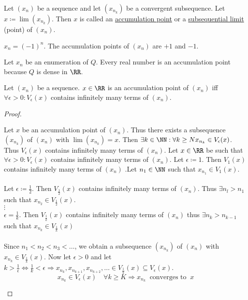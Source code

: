 \documentclass[class=scrartcl, crop=false]{standalone}
\begin{document}
\begin{definition}
  Let $(x_n)$ be a sequence and let $(x_{n_k})$ be a convergent subsequence. Let $x \coloneqq \lim(x_{n_k})$. Then $x$ is called an \ul{accumulation point} or a \ul{subsequential limit} (point) of $(x_n)$.
\end{definition}

\begin{example}
  $x_n = (-1)^n$. The accumulation points of $(x_n)$ are $+1$ and $-1$.
\end{example}
\begin{example}
  Let $x_n$ be an enumeration of $Q$. Every real number is an accumulation point because $Q$ is dense in $\RR$.
\end{example}

\begin{theorem}
  Let $(x_n)$ be a sequence. $x \in \RR$ is an accumulation point of $(x_n)$ iff $\forall \epsilon > 0: V_\epsilon(x)$ contains infinitely many terms of $(x_n)$.
  \begin{proof}
    \begin{itemize}
      \ii[]
      \ii[$(\Rightarrow)$ ]
      Let $x$ be an accumulation point of $(x_n)$. Thus there exists a subsequence $(x_{n_k})$ of $(x_n)$ with $\lim(x_{n_k}) = x$. Then $\exists k \in \NN: \forall k \geq N x_{n_k} \in V_\epsilon(x)$. Thus $V_\epsilon(x)$ contains infinitely many terms of $(x_n)$. 
      \ii[$(\Leftarrow)$ ]
      Let $x \in \RR$ be such that $\forall \epsilon > 0:V_\epsilon(x)$ contains infinitely many terms of $(x_n)$. Let $\epsilon \coloneqq 1$. Then $V_1(x)$ contains infinitely many terms of $(x_n)$ .Let $n_1 \in \NN$ such that $x_{n_1} \in V_1(x)$.
      \\\\
      Let $\epsilon \coloneqq \frac{1}{2}$. Then $V_{\frac{1}{2}}(x)$ contains infinitely many terms of $(x_n)$. Thus $\exists n_l > n_1$ such that $x_{n_2} \in V_{\frac{1}{2}}(x)$.
      \\
      $\vdots$
      \\
      $\epsilon = \frac{1}{k}$. Then $V_{\frac{1}{k}}(x)$ contains infinitely many terms of $(x_n)$ thus $\exists n_k > n_{k - 1}$ such that $x_{n_k} \in V_{\frac{1}{k}}(x)$ 
      \\\\
      Since $n_1 < n_2 < n_3 < \dots$, we obtain a subsequence $(x_{n_k})$ of $(x_n)$ with $x_{n_k} \in V_{\frac{1}{k}}(x)$. Now let $\epsilon > 0$ and let $k > \frac{1}{\epsilon} \Leftrightarrow \frac{1}{k} < \epsilon \Rightarrow x_{n_k}, x_{n_{k + 1}}, x_{n_{k + 2}}, \dots \in V_{\frac{1}{k}}(x) \subseteq V_\epsilon(x)$.
      \[
        x_{n_k} \in V_\epsilon(x) \quad \forall k \geq K \Rightarrow x_{n_k} \ \text{ converges to } \ x
      \]
    \end{itemize}
  \end{proof}
\end{theorem}
\end{document}
